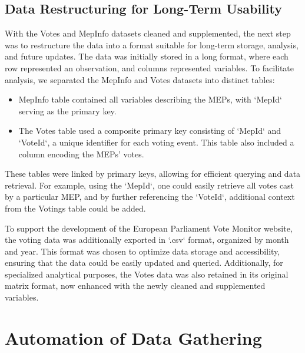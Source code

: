 \documentclass{report}
\begin{document}
        \section{Data Restructuring for Long-Term Usability}

            With the Votes and MepInfo datasets cleaned and supplemented, the next step was to restructure the data into
            a
            format suitable for long-term storage, analysis, and future updates. The data was initially stored in a long
            format,
            where each row represented an observation, and columns represented variables. To facilitate analysis, we
            separated
            the MepInfo and Votes datasets into distinct tables:
            \begin{itemize}
                \item
                MepInfo table contained all variables describing the MEPs, with `MepId` serving as the primary key.
                \item
                The Votes table used a composite primary key consisting of `MepId` and `VoteId`, a unique identifier for
                each
                voting event. This table also included a column encoding the MEPs' votes.
            \end{itemize}

            These tables were linked by primary keys, allowing for efficient querying and data retrieval. For example,
            using the
            `MepId`, one could easily retrieve all votes cast by a particular MEP, and by further referencing the
            `VoteId`,
            additional context from the Votings table could be added.

            To support the development of the European Parliament Vote Monitor website, the voting data was additionally
            exported in `.csv` format, organized by month and year. This format was chosen to optimize data storage and
            accessibility, ensuring that the data could be easily updated and queried. Additionally, for specialized
            analytical
            purposes, the Votes data was also retained in its original matrix format, now enhanced with the newly
            cleaned and
            supplemented variables.


    \chapter{Automation of Data Gathering}
\end{document}
